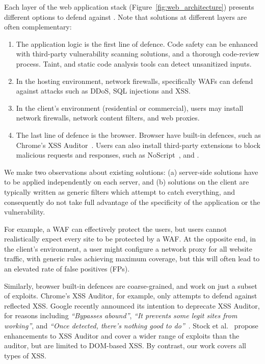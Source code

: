 Each layer of the web application stack (Figure~\ref{fig:web_architecture}) presents different options to defend against \xss. Note that solutions at different layers are often complementary:
\begin{enumerate}

\item The application logic is the first line of defence.
  Code safety can be enhanced with third-party vulnerability scanning solutions, and a thorough
  code-review process. Taint, and static code analysis tools can detect unsanitized inputs.

\item In the hosting environment, network firewalls, specifically \acp{WAF} can defend against attacks such as \ac{DDoS}, \ac{SQL} injections and \ac{XSS}.

\item In the client's environment (residential or commercial), users may install network firewalls, network content filters, and web proxies.

\item The last line of defence is the browser.
  Browser have built-in defences, such as
  Chrome's \ac{XSS} Auditor~\cite{xssauditor}. Users can also
  install third-party extensions to block malicious requests and
  responses, such as NoScript~\cite{Noscript}, and \sys.
\end{enumerate}

We make two observations about existing solutions: (a) server-side
solutions have to be applied independently on each server, and (b)
solutions on the client are typically written as generic filters which
attempt to catch everything, and consequently do not take full advantage
of the specificity of the application or the vulnerability.

For example, a \ac{WAF} can effectively protect the users, 
but users cannot realistically expect every site to
be protected by a \ac{WAF}. At the opposite end, in the client's
environment, a user might configure a network proxy for all website
traffic, with generic rules achieving maximum coverage, but this
will often lead to an elevated rate of false positives (FPs).

Similarly, browser built-in defences are coarse-grained, and 
work on just a subset of exploits. Chrome's XSS Auditor, for example, only
attempts to defend against reflected \ac{XSS}. Google recently
announced its intention to deprecate XSS Auditor, for reasons
including \emph{``Bypasses abound''}, \emph{``It prevents some legit
  sites from working''}, and \emph{``Once detected, there's nothing
  good to do''}~\cite{deprecatexssauditor}. Stock et
al.~\cite{precise_dom_xss} propose enhancements to XSS Auditor and
cover a wider range of exploits than the auditor, but are limited to
DOM-based \ac{XSS}.  By contrast, our work covers all types of \ac{XSS}.

